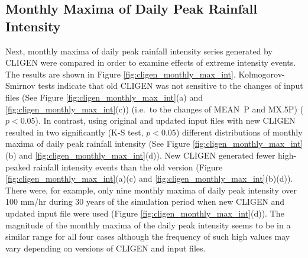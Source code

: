 \subsection{Monthly Maxima of Daily Peak Rainfall Intensity}
Next, monthly maxima of daily peak rainfall intensity series generated by CLIGEN
were compared in order to examine effects of extreme intensity events. The
results are shown in Figure \ref{fig:cligen_monthly_max_int}.
Kolmogorov-Smirnov tests indicate that old CLIGEN was not sensitive to the
changes of input files (See Figure \ref{fig:cligen_monthly_max_int}(a) and
\ref{fig:cligen_monthly_max_int}(c)) (i.e.\ to the changes of MEAN~P and
{MX.5P}) ($p<0.05$). In contrast, using original and updated input files with
new CLIGEN resulted in two significantly (K-S test, $p<0.05$) different
distributions of monthly maxima of daily peak rainfall intensity (See Figure
\ref{fig:cligen_monthly_max_int}(b) and \ref{fig:cligen_monthly_max_int}(d)).
New CLIGEN generated fewer high-peaked rainfall intensity events than the old
version (Figure \ref{fig:cligen_monthly_max_int}(a)(c) and
\ref{fig:cligen_monthly_max_int}(b)(d)). There were, for example, only nine
monthly maxima of daily peak intensity over 100 mm/hr during 30 years of the
simulation period when new CLIGEN and updated input file were used (Figure
\ref{fig:cligen_monthly_max_int}(d)). The magnitude of the monthly maxima of the
daily peak intensity seems to be in a similar range for all four cases although
the frequency of such high values may vary depending on versions of CLIGEN and
input files.


